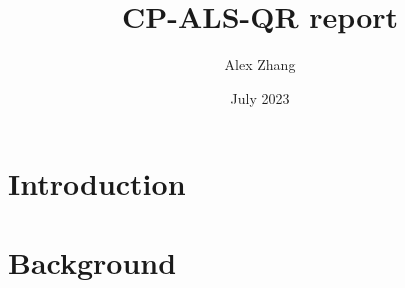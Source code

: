 \documentclass{article}
\title{CP-ALS-QR report}
\author{Alex Zhang}
\date{July 2023}
\begin{document}
\maketitle
\section{Introduction}



\section{Background}
\end{document}

